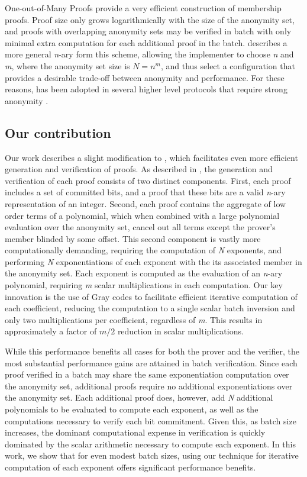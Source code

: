 \documentclass{article}
\begin{document}
One-out-of-Many Proofs \cite{groth} provide a very efficient construction of membership proofs. Proof size only grows logarithmically with the size of the anonymity set, and proofs with overlapping anonymity sets may be verified in batch with only minimal extra computation for each additional proof in the batch. \cite{bootle} describes a more general \emph{n}-ary form this scheme, allowing the implementer to choose \emph{n} and \emph{m}, where the anonymity set size is $N = n^m$, and thus select a configuration that provides a desirable trade-off between anonymity and performance. For these reasons, \cite{groth} has been adopted in several higher level protocols that require strong anonymity \cite{bootle}\cite{triptych}\cite{arcturus}\cite{lelantus}.


\subsection{Our contribution}
Our work describes a slight modification to \cite{groth}, which facilitates even more efficient generation and verification of proofs. As described in \cite{groth}, the generation and verification of each proof consists of two distinct components. First, each proof includes a set of committed bits, and a proof that these bits are a valid \emph{n}-ary representation of an integer. Second, each proof contains the aggregate of low order terms of a polynomial, which when combined with a large polynomial evaluation over the anonymity set, cancel out all terms except the prover's member blinded by some offset. This second component is vastly more computationally demanding, requiring the computation of \emph{N} exponents, and performing \emph{N} exponentiations of each exponent with the its associated member in the anonymity set. Each exponent is computed as the evaluation of an \emph{n}-ary polynomial, requiring \emph{m} scalar multiplications in each computation. Our key innovation is the use of Gray codes \cite{gray}\cite{guan} to facilitate efficient iterative computation of each coefficient, reducing the computation to a single scalar batch inversion and only two multiplications per coefficient, regardless of \emph{m}. This results in approximately a factor of $m/2$ reduction in scalar multiplications.

While this performance benefits all cases for both the prover and the verifier, the most substantial performance gains are attained in batch verification. Since each proof verified in a batch may share the same exponentiation computation over the anonymity set, additional proofs require no additional exponentiations over the anonymity set. Each additional proof does, however, add \emph{N} additional polynomials to be evaluated to compute each exponent, as well as the computations necessary to verify each bit commitment. Given this, as batch size increases, the dominant computational expense in verification is quickly dominated by the scalar arithmetic necessary to compute each exponent. In this work, we show that for even modest batch sizes, using our technique for iterative computation of each exponent offers significant performance benefits.
\end{document}
